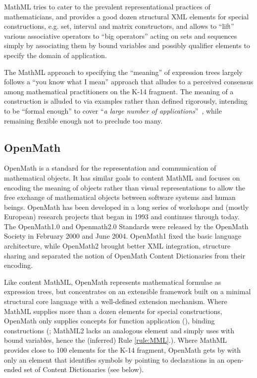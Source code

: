 \documentclass{llncs}
\begin{document}
MathML tries to cater to the prevalent representational practices of mathematicians, and
provides a good dozen structural XML elements for special constructions, e.g. set,
interval and matrix constructors, and allows to ``lift'' various associative operators to
``big operators'' acting on sets and sequences simply by associating them by bound
variables and possibly qualifier elements to specify the domain of application.

The MathML approach to specifying the ``meaning'' of expression trees largely follows a
``you know what I mean'' approach that alludes to a perceived consensus among mathematical
practitioners on the K-14 fragment. The meaning of a construction is alluded to via
examples rather than defined rigorously, intending to be ``formal enough'' to cover
``{\emph{a large number of applications}}''~\cite[4.1.2]{WorldWideWebConsortium2003b},
while remaining flexible enough not to preclude too many.

\subsection{OpenMath}\label{sec:openmath}

OpenMath is a standard for the representation and communication of mathematical objects.
It has similar goals to content MathML and focuses on encoding the meaning of objects
rather than visual representations to allow the free exchange of mathematical objects
between software systems and human beings. OpenMath has been developed in a long series of
workshops and (mostly European) research projects that began in 1993 and continues through
today. The OpenMath1.0 and Openmath2.0 Standards were released by the OpenMath Society in
February 2000 and June 2004. OpenMath1 fixed the basic language architecture, while
OpenMath2 brought better XML integration, structure sharing and separated the notion of
OpenMath Content Dictionaries from their encoding.

Like content MathML, OpenMath represents mathematical formulae as expression trees, but
concentrates on an extensible framework built on a minimal structural core language with a
well-defined extension mechanism. Where MathML supplies more than a dozen elements for
special constructions, OpenMath only supplies concepts for function application
({}), binding constructions ({}; MathML2 lacks an analogous
element and simply uses {} with bound variables, hence the (inferred) Rule
\ref{rule:MML}.). Where MathML provides close to 100 elements for the K-14 fragment,
OpenMath gets by with only an {} element that identifies symbols by pointing
to declarations in an open-ended set of Content Dictionaries (see below).
\end{document}

